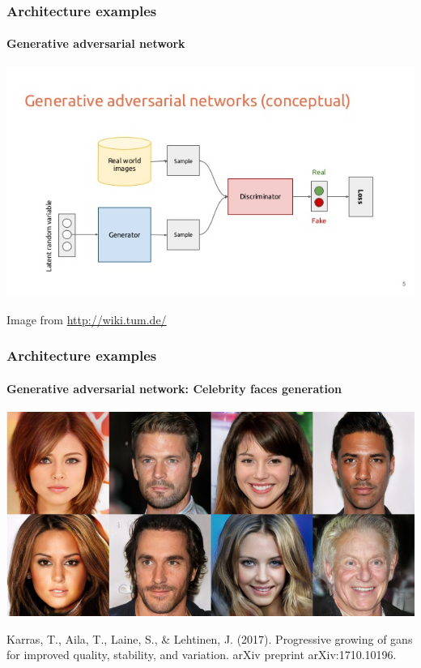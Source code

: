 \documentclass[9pt]{beamer}
\begin{document}



\begin{frame}
  \frametitle{Architecture examples}

  \framesubtitle{Generative adversarial network}

  \begin{center}
    \includegraphics[width=\linewidth]{images/GAN_1.jpg}
  \end{center}

  {\small Image from \url{http://wiki.tum.de/}}
\end{frame}

\begin{frame}
  \frametitle{Architecture examples}

  \framesubtitle{Generative adversarial network: Celebrity faces generation}

  \begin{center}
    \includegraphics[width=0.7\linewidth]{images/progan.png}
  \end{center}

  \bigskip

  {\footnotesize Karras, T., Aila, T., Laine, S., \& Lehtinen,
    J. (2017). Progressive growing of gans for improved quality,
    stability, and variation. arXiv preprint arXiv:1710.10196.}
\end{frame}
\end{document}
